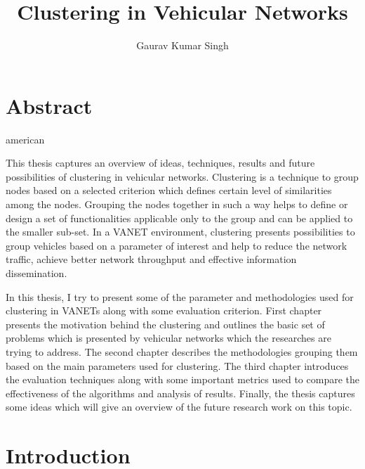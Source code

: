 \documentclass[]{ccs-thesis}
\author{Gaurav Kumar Singh}
\title{Clustering in Vehicular Networks}
\begin{document}

\maketitle

\chapter*{Abstract}
\begin{otherlanguage*}{american}

    This thesis captures an overview of ideas, techniques, results and future possibilities of clustering in vehicular networks.
    Clustering is a technique to group nodes based on a selected criterion which defines certain level of similarities among the nodes.
    Grouping the nodes together in such a way helps to define or design a set of functionalities applicable only to the
    group and can be applied to the smaller sub-set. In a \ac{VANET} environment, clustering presents possibilities
    to group vehicles based on a parameter of interest and help to reduce the network traffic, achieve better network throughput and
    effective information dissemination.

    In this thesis, I try to present some of the parameter and methodologies used for clustering in \ac{VANET}s along with some evaluation criterion.
    First chapter presents the motivation behind the clustering and outlines the basic set of problems which is presented by vehicular
    networks which the researches are trying to address. The second chapter describes the methodologies grouping them based on the main
    parameters used for clustering. The third chapter introduces the evaluation techniques along with some important metrics used to
    compare the effectiveness of the algorithms and analysis of results. Finally, the thesis captures some ideas which will give an
    overview of the future research work on this topic.


\end{otherlanguage*}


\acresetall

\cleardoublepage
\tableofcontents

\cleardoublepage
{}

\chapter{Introduction}
\label{sec:introduction}
\end{document}
